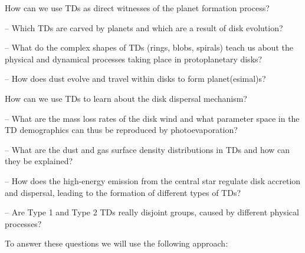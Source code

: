 \documentclass[10pt,fleqn,twoside,a4paper]{article}
\begin{document}
\begin{highlight}
How can we use TDs as direct witnesses of the planet formation process?
\end{highlight}
\begin{compactitemize}
\item[--] Which TDs are carved by planets and which are a result of disk evolution? 
\item[--] What do the complex shapes of TDs (rings, blobs, spirals) teach us about the physical and
dynamical processes taking place in protoplanetary disks?
\item[--] How does dust evolve and travel within disks to form planet(esimal)s?
\end{compactitemize}
\vspace{1em}
\begin{highlight}
How can we use TDs to learn about the disk dispersal mechanism?
\end{highlight}
\begin{compactitemize}
\item[--] What are the mass loss rates of the disk wind and
  what parameter space in the TD demographics can thus be reproduced
  by photoevaporation?
\item[--] What are the dust and gas surface density
  distributions in TDs and how can they be
  explained?
\item[--] How does the high-energy emission from the central
  star regulate disk accretion and dispersal, leading to the formation
  of different types of TDs?
\item[--] Are Type 1 and Type 2 TDs really disjoint groups, caused by 
  different physical processes?
\end{compactitemize} 
\vspace{1em}

To answer these questions we will use the following approach: 
\end{document}
